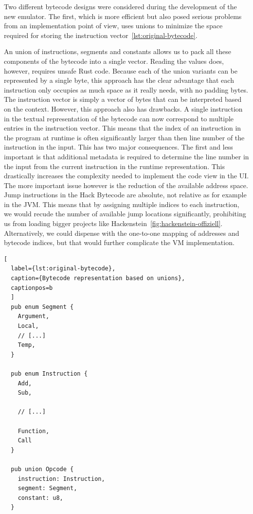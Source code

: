 Two different bytecode designs were considered during the development of the new emulator.
The first, which is more efficient but also posed serious problems from an implementation point of view, uses unions to minimize the space required for storing the instruction vector~\ref{lst:original-bytecode}.

An union of instructions, segments and constants allows us to pack all these components of the bytecode into a single vector. Reading the values does, however, requires unsafe Rust code.
Because each of the union variants can be represented by a single byte, this approach has the clear advantage that each instruction only occupies as much space as it really needs, with no padding bytes. The instruction vector is simply a vector of bytes that can be interpreted based on the context.
However, this approach also has drawbacks. A single instruction in the textual representation of the bytecode can now correspond to multiple entries in the instruction vector. This means that the index of an instruction in the program at runtime is often significantly larger than then line number of the instruction in the input.
This has two major consequences. The first and less important is that additional metadata is required to determine the line number in the input from the current instruction in the runtime representation. This drastically increases the complexity needed to implement the code view in the UI.
The more important issue however is the reduction of the available address space. Jump instructions in the Hack Bytecode are absolute, not relative as for example in the JVM.
This means that by assigning multiple indices to each instruction, we would recude the number of available jump locations significantly, prohibiting us from loading bigger projects like Hackenstein~\ref{fig:hackenstein-offiziell}.
Alternatively, we could dispense with the one-to-one mapping of addresses and bytecode indices, but that would further complicate the VM implementation.

\begin{lstlisting}[
  label={lst:original-bytecode},
  caption={Bytecode representation based on unions},
  captionpos=b
  ]
  pub enum Segment {
    Argument,
    Local,
    // [...]
    Temp,
  }

  pub enum Instruction {
    Add,
    Sub,

    // [...]

    Function,
    Call
  }

  pub union Opcode {
    instruction: Instruction,
    segment: Segment,
    constant: u8,
  }
\end{lstlisting}

